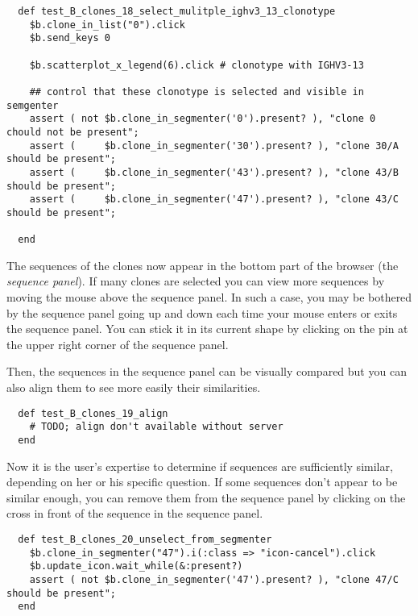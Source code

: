 \begin{verbatim}
  def test_B_clones_18_select_mulitple_ighv3_13_clonotype
    $b.clone_in_list("0").click
    $b.send_keys 0

    $b.scatterplot_x_legend(6).click # clonotype with IGHV3-13

    ## control that these clonotype is selected and visible in semgenter
    assert ( not $b.clone_in_segmenter('0').present? ), "clone 0 chould not be present";
    assert (     $b.clone_in_segmenter('30').present? ), "clone 30/A should be present";
    assert (     $b.clone_in_segmenter('43').present? ), "clone 43/B should be present";
    assert (     $b.clone_in_segmenter('47').present? ), "clone 43/C should be present";

  end
\end{verbatim}

The sequences of the clones now appear in the bottom part of the browser (the
\textit{sequence panel}). If many clones are selected you can view more sequences
by moving the mouse above the sequence panel.
 In such a case, you may be bothered by the sequence panel going up and
down each time your mouse enters or exits the sequence panel. You can stick it
in its current shape by clicking on the pin at the upper right corner of the
sequence panel.

Then, the sequences in the sequence panel can be visually compared but you can also align
them to see more easily their similarities.


\begin{verbatim}
  def test_B_clones_19_align
    # TODO; align don't available without server
  end
\end{verbatim}

Now it is the user's expertise to determine if sequences are sufficiently
similar, depending on her or his specific question. If some sequences don't appear to be similar enough, you can remove
them from the sequence panel by clicking on the cross in front of the sequence in
the sequence panel.
\begin{verbatim}
  def test_B_clones_20_unselect_from_segmenter
    $b.clone_in_segmenter("47").i(:class => "icon-cancel").click
    $b.update_icon.wait_while(&:present?)
    assert ( not $b.clone_in_segmenter('47').present? ), "clone 47/C should be present";
  end
\end{verbatim}

